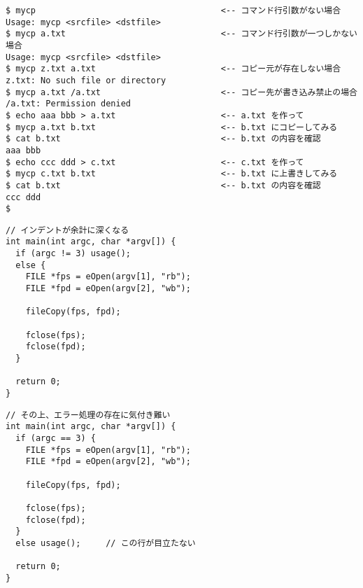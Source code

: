 \documentclass[a4j,dvipdfmx]{jarticle}
\begin{document}
\def\lstlistingname{リスト}


\begin{lstlisting}[caption=実行例]
$ mycp                                     <-- コマンド行引数がない場合
Usage: mycp <srcfile> <dstfile>
$ mycp a.txt                               <-- コマンド行引数が一つしかない場合
Usage: mycp <srcfile> <dstfile>
$ mycp z.txt a.txt                         <-- コピー元が存在しない場合
z.txt: No such file or directory
$ mycp a.txt /a.txt                        <-- コピー先が書き込み禁止の場合
/a.txt: Permission denied
$ echo aaa bbb > a.txt                     <-- a.txt を作って
$ mycp a.txt b.txt                         <-- b.txt にコピーしてみる
$ cat b.txt                                <-- b.txt の内容を確認
aaa bbb
$ echo ccc ddd > c.txt                     <-- c.txt を作って
$ mycp c.txt b.txt                         <-- b.txt に上書きしてみる
$ cat b.txt                                <-- b.txt の内容を確認
ccc ddd
$
\end{lstlisting}

\newpage



\begin{multicols}{2}
\begin{lstlisting}[caption=解答例２の改悪バージョン１）]
// インデントが余計に深くなる
int main(int argc, char *argv[]) {
  if (argc != 3) usage();
  else {
    FILE *fps = eOpen(argv[1], "rb");
    FILE *fpd = eOpen(argv[2], "wb");

    fileCopy(fps, fpd);

    fclose(fps);
    fclose(fpd);
  }
  
  return 0;
}
\end{lstlisting}

\begin{lstlisting}[caption=解答例２の改悪バージョン２]
// その上、エラー処理の存在に気付き難い
int main(int argc, char *argv[]) {
  if (argc == 3) {
    FILE *fps = eOpen(argv[1], "rb");
    FILE *fpd = eOpen(argv[2], "wb");

    fileCopy(fps, fpd);

    fclose(fps);
    fclose(fpd);
  }
  else usage();     // この行が目立たない

  return 0;
}
\end{lstlisting}
\end{multicols}
\end{document}
